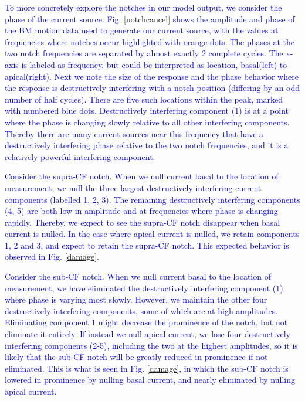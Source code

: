 \documentclass{biophys-new}
\begin{document}
\par{\textcolor{blue}{To more concretely explore the notches in our model output, we consider the phase of the current source. Fig. \ref{notchcancel} shows the amplitude and phase of the BM motion data used to generate our current source, with the values at frequencies where notches occur highlighted with orange dots. The phases at the two notch frequencies are separated by almost exactly 2 complete cycles. The x-axis is labeled as frequency, but could be interpreted as location, basal(left) to apical(right). Next we note the size of the response and the phase behavior where the response is destructively interfering with a notch position (differing by an odd number of half cycles). There are five such locations within the peak, marked with numbered blue dots. Destructively interfering component (1) is at a point where the phase is changing slowly relative to all other interfering components. Thereby there are many current sources near this frequency that have a destructively interfering phase relative to the two notch frequencies, and it is a relatively powerful interfering component.}}
\par{\textcolor{blue}{Consider the supra-CF notch. When we null current basal to the location of measurement, we null the three largest destructively interfering current components (labelled 1, 2, 3). The remaining destructively interfering components (4, 5) are both low in amplitude and at frequencies where phase is changing rapidly. Thereby, we expect to see the supra-CF notch disappear when basal current is nulled. In the case where apical current is nulled, we retain components 1, 2 and 3, and expect to retain the supra-CF notch. This expected behavior is observed in Fig. \ref{damage}.}}
\par{\textcolor{blue}{Consider the sub-CF notch. When we null current basal to the location of measurement, we have eliminated the destructively interfering component (1) where phase is varying most slowly. However, we maintain the other four destructively interfering components, some of which are at high amplitudes. Eliminating component 1 might decrease the prominence of the notch, but not eliminate it entirely. If instead we null apical current, we lose four destructively interfering components (2-5), including the two at the highest amplitudes, so it is likely that the sub-CF notch will be greatly reduced in prominence if not eliminated. This is what is seen in Fig. \ref{damage}, in which the sub-CF notch is lowered in prominence by nulling basal current, and nearly eliminated by nulling apical current.}}
\end{document}
